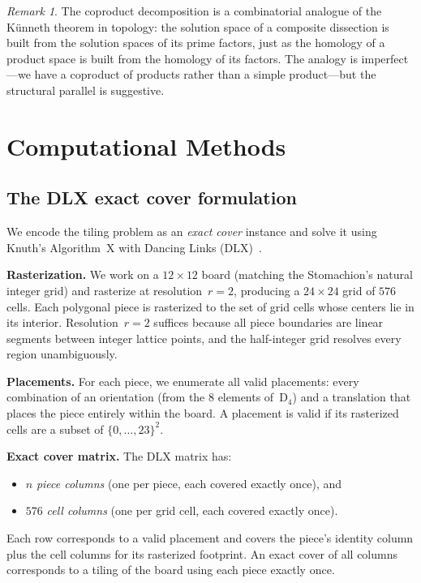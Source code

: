 \documentclass[12pt]{article}
\theoremstyle{definition}
\theoremstyle{remark}
\newtheorem{remark}[theorem]{Remark}
\newcommand{\D}{\mathrm{D}}
\begin{document}
\begin{remark}
The coproduct decomposition is a combinatorial analogue of the
K\"unneth theorem in topology: the solution space of a composite
dissection is built from the solution spaces of its prime factors, just as
the homology of a product space is built from the homology of its factors.
The analogy is imperfect---we have a coproduct of products rather than a
simple product---but the structural parallel is suggestive.
\end{remark}

\section{Computational Methods}
\label{sec:methods}

\subsection{The DLX exact cover formulation}

We encode the tiling problem as an \emph{exact cover} instance and solve
it using Knuth's Algorithm~X with Dancing Links
(DLX)~\cite{Knuth2000}.

\textbf{Rasterization.} We work on a $12 \times 12$ board (matching the
Stomachion's natural integer grid) and rasterize at resolution~$r = 2$,
producing a $24 \times 24$ grid of $576$ cells. Each polygonal piece is
rasterized to the set of grid cells whose centers lie in its interior.
Resolution~$r = 2$ suffices because all piece boundaries are linear
segments between integer lattice points, and the half-integer grid
resolves every region unambiguously.

\textbf{Placements.} For each piece, we enumerate all valid
placements: every combination of an orientation (from the 8 elements
of~$\D_4$) and a translation that places the piece entirely within the
board. A placement is valid if its rasterized cells are a subset of
$\{0, \ldots, 23\}^2$.

\textbf{Exact cover matrix.} The DLX matrix has:
\begin{itemize}
  \item $n$ \emph{piece columns} (one per piece, each covered exactly
    once), and
  \item $576$ \emph{cell columns} (one per grid cell, each covered
    exactly once).
\end{itemize}
Each row corresponds to a valid placement and covers the piece's identity
column plus the cell columns for its rasterized footprint. An exact cover
of all columns corresponds to a tiling of the board using each piece
exactly once.
\end{document}
